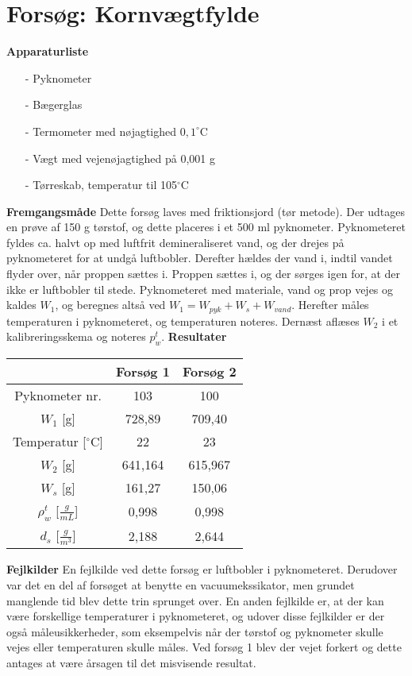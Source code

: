 \chapter{Forsøg: Kornvægtfylde}

\textbf{Apparaturliste}
\begin{itemize}
\item[-] Pyknometer
\item[-] Bægerglas
\item[-] Termometer med nøjagtighed $0,\!1^{\circ}$C
\item[-] Vægt med vejenøjagtighed på 0,001 g
\item[-] Tørreskab, temperatur til 105$^{\circ}$C
\end{itemize}

\textbf{Fremgangsmåde}
\newline
Dette forsøg laves med friktionsjord (tør metode). Der udtages en prøve af 150 g tørstof, og dette placeres i et 500 ml pyknometer. Pyknometeret fyldes ca. halvt op med luftfrit demineraliseret vand, og der drejes på pyknometeret for at undgå luftbobler. Derefter hældes der vand i, indtil vandet flyder over, når proppen sættes i. Proppen sættes i, og der sørges igen for, at der ikke er luftbobler til stede. Pyknometeret med materiale, vand og prop vejes og kaldes $W_{1}$, og beregnes altså ved $W_1 = W_{pyk} + W_s + W_{vand}$. Herefter måles temperaturen i pyknometeret, og temperaturen noteres. Dernæst aflæses $W_{2}$ i et kalibreringsskema og noteres $p_w^t$.
\newline
\newline
\textbf{Resultater}
\begin{center}
	\begin{tabular}{ |c|c|c| } 
		\hline
		 & Forsøg 1 & Forsøg 2 \\	\hline
		Pyknometer nr. & 103 & 100 \\	\hline
		$W_1$ [g] & 728,89 & 709,40 \\	\hline 
		Temperatur [$^{\circ}$C] & 22 & 23 \\ \hline
		$W_2$ [g] & 641,164 & 615,967 \\	\hline
		$W_s$ [g] & 161,27 & 150,06 \\	\hline
		$\rho_{w}^t$ [$\frac{g}{mL}$] & 0,998 & 0,998 \\	\hline
		$d_s$ [$\frac{g}{m^3}$] & 2,188 & 2,644	\\	\hline	
	\end{tabular}
\end{center}

\textbf{Fejlkilder}
\newline
En fejlkilde ved dette forsøg er luftbobler i pyknometeret. Derudover var det en del af forsøget at benytte en vacuumekssikator, men grundet manglende tid blev dette trin sprunget over. En anden fejlkilde er, at der kan være forskellige temperaturer i pyknometeret, og udover disse fejlkilder er der også måleusikkerheder, som eksempelvis når der tørstof og pyknometer skulle vejes eller temperaturen skulle måles. 
Ved forsøg 1 blev der vejet forkert og dette antages at være årsagen til det misvisende resultat.